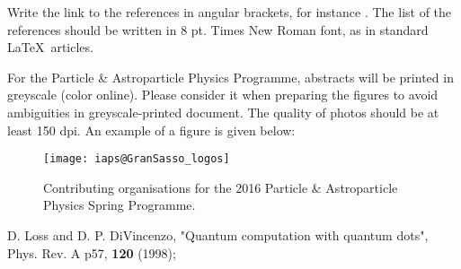 \documentclass[a4paper,10pt,english]{article}
\begin{document}
Write the link to the references in angular brackets, for instance \cite{key-1}. The list of the references should be written in 8 pt. Times New Roman font, as in standard \LaTeX \ articles. 

For the Particle \& Astroparticle Physics Programme, abstracts will be printed in greyscale (color online). Please consider it when preparing the figures to avoid ambiguities in greyscale-printed document. The quality of photos should be at least 150 dpi. An example of a figure is given below:

\begin{figure}[h]
\center
\texttt{[image: iaps@GranSasso\_logos]}
\caption{Contributing organisations for the 2016 Particle \& Astroparticle Physics Spring Programme.}
\end{figure}

\begin{thebibliography}{References}

D. Loss and D. P. DiVincenzo, "Quantum computation with quantum dots", Phys. Rev. A p57, \textbf{120} (1998);

\end{thebibliography}
\end{document}
